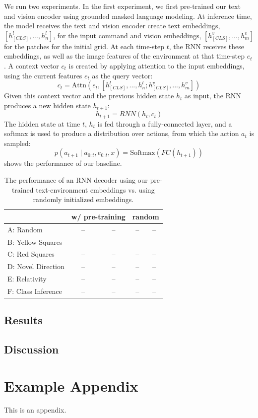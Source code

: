 \documentclass[11pt]{article}
\begin{document}
We run two experiments.
%
In the first experiment, we first pre-trained our text and vision encoder using grounded masked language modeling. 
%
At inference time, the model receives the text and vision encoder create text embeddings, $[h_{[CLS]}^{l},...,h_{n}^{l}]$, for the input command and vision embeddings, $[h_{[CLS]}^{v},...,h_{m}^{v}]$ for the patches for the initial grid.
%
At each time-step $t$, the RNN receives these embeddings, as well as the image features of the environment at that time-step $e_t$.
%
A context vector $c_t$ is created by applying attention to the input embeddings, using the current features $e_t$ as the query vector:
$$
c_t = \text{Attn}(e_t, [h_{[CLS]}^{l},...,h_{n}^{l}; h_{[CLS]}^{v},...,h_{m}^{v}] )
$$
Given this context vector and the previous hidden state $h_{t}$ as input, the RNN produces a new hidden state $h_{t+1}$:
$$
h_{t+1} = RNN(h_t, c_t)
$$
The hidden state at time $t$, $h_t$ is fed through a fully-connected layer, and a softmax is used to produce a distribution over actions, from which the action $a_t$ is sampled:
$$
p(a_{t+1} \mid a_{0:t}, e_{0:t}, x) = \text{Softmax}(FC(h_{t+1}))
$$
 shows the performance of our baseline.

\begin{table}
\begin{center}
\begin{tabularx}{\columnwidth}{ l|cccc| }
\toprule
\multicolumn{1}{c}{} 
& \multicolumn{2}{c}{w/ pre-training}  
& \multicolumn{2}{c}{random}\\
\midrule
A: Random & --  & --  & -- &  -- \\
B: Yellow Squares & --  & --  & -- &  -- \\
C: Red Squares & --  & --  & -- &  -- \\
D: Novel Direction & --  & --  & -- &  -- \\
E: Relativity & --  & --  & -- &  -- \\
F: Class Inference & --  & --  & -- &  -- \\
\bottomrule
\end{tabularx}
\end{center}
\caption{The performance of an RNN decoder using our pre-trained text-environment embeddings vs. using randomly initialized embeddings.}
\label{tab:baseline_results}
\end{table}

\subsection{Results}

\subsection{Discussion}






\appendix

\section{Example Appendix}
\label{sec:appendix}

This is an appendix.
\end{document}
